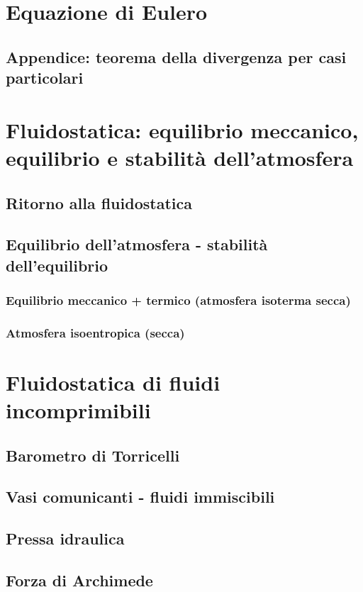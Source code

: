 \documentclass[a4paper,11pt]{report}
\begin{document}
\chapter{Equazione di Eulero}
	\section{Appendice: teorema della divergenza per casi particolari}
		
	

\chapter{Fluidostatica: equilibrio meccanico, equilibrio e stabilità dell'atmosfera}
	\section{Ritorno alla fluidostatica}
	\section{Equilibrio dell'atmosfera - stabilità dell'equilibrio}
		\subsection{Equilibrio meccanico + termico (atmosfera isoterma secca)}		
		\subsection{Atmosfera isoentropica (secca)}
					

\chapter{Fluidostatica di fluidi incomprimibili}
	\section{Barometro di Torricelli}
	\section{Vasi comunicanti - fluidi immiscibili}
	\section{Pressa idraulica}
	\section{Forza di Archimede}
\end{document}

